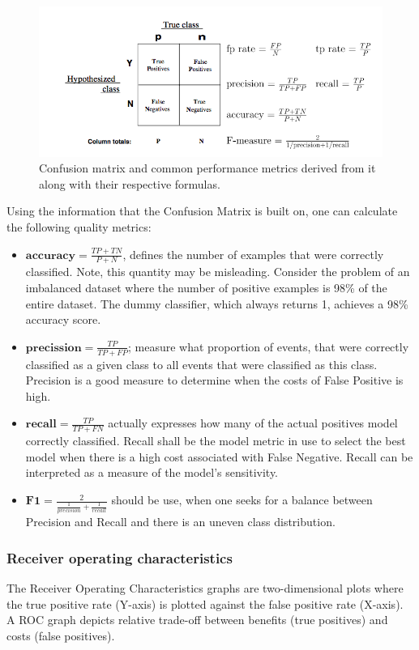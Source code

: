 \begin{figure}[h]
\includegraphics[width=\textwidth]{figures/ConfusionMatrix.png}
\caption{Confusion matrix and common performance metrics derived from it along with their respective formulas. 
\label{fig:CM}}
\end{figure}

Using the information that the Confusion Matrix is built on, one can calculate the following quality metrics:

\begin{itemize}
    \item $\mathbf{accuracy} = \frac{TP+TN}{P+N}$, defines the number of examples that were correctly classified. Note, this quantity may be misleading. Consider the problem of an imbalanced dataset where the number of positive examples is 98\% of the entire dataset. The dummy classifier, which always returns 1, achieves a 98\% accuracy score.
    \item $\mathbf{precission}=\frac{TP}{TP+FP}$; measure what proportion of events, that were correctly classified as a given class to all events that were classified as this class. Precision is a good measure to determine when the costs of False Positive is high. 
    \item $\mathbf{recall}=\frac{TP}{TP+FN}$ actually expresses how many of the actual positives model correctly classified. Recall shall be the model metric in use to select the best model when there is a high cost associated with False Negative. Recall can be interpreted as a measure of the model's sensitivity.
    \item $\mathbf{F1} =\frac{2}{\frac{1}{precision}+ \frac{1}{recall}}$ should be use, when one seeks for a balance between Precision and Recall and there is an uneven class distribution. 
\end{itemize}

\subsubsection{Receiver operating characteristics}
\label{sec:ROC}
The Receiver Operating Characteristics graphs are two-dimensional plots where the true positive
rate (Y-axis) is plotted against the false positive rate (X-axis). A ROC graph depicts relative trade-off between benefits (true positives) and costs (false positives).  

